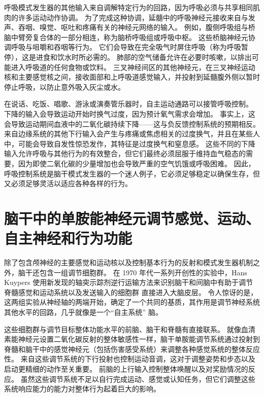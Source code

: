 呼吸模式发生器的其他输入来自调解特定行为的回路，因为呼吸必须与共享相同肌肉的许多运动动作协调。
为了完成这种协调，延髓中的呼吸神经元接收来自与发声、吞咽、嗅觉、呕吐和疼痛有关的神经元网络的输入。
例如，腹侧呼吸组与桥脑中臂旁复合体的一部分相连，称为脑桥呼吸组或呼吸中枢。
这些桥脑神经元协调呼吸与咀嚼和吞咽等行为。
它们会导致在完全吸气时屏住呼吸（称为呼吸暂停），这是进食和饮水时所必需的。
肺部的空气储备允许在必要时咳嗽，以排出可能进入呼吸道的任何食物或饮料。
三叉神经间区的其他神经元，在三叉神经运动核和主要感觉核之间，接收面部和上呼吸道感觉输入，并投射到延髓腹外侧以暂时停止呼吸，以防止意外吸入灰尘或水。


在说话、吃饭、唱歌、游泳或演奏管乐器时，自主运动通路可以接管呼吸控制。
下降的输入会导致运动开始时换气过度，因为预计氧气需求会增加。
事实上，这会导致运动期间血液中的二氧化碳持续下降——这与负反馈控制系统的预期相反。
来自边缘系统的其他下行输入会产生与疼痛或焦虑相关的过度换气，并且在某些人中，可能会导致自发性惊恐发作，其特征是过度换气和窒息感。
这些不同的下降输入允许呼吸与其他行为的有效整合，但它们最终必须屈服于维持血气稳态的需要，因为即使二氧化碳的少量增加也会导致严重的空气饥饿或呼吸困难。
因此，呼吸控制系统是脑干模式发生器的一个迷人例子，它必须足够稳定以确保生存，但又必须足够灵活以适应各种各样的行为。



\section{脑干中的单胺能神经元调节感觉、运动、自主神经和行为功能}

除了包含颅神经的主要感觉和运动核以及控制基本行为的反射和模式发生器机制之外，脑干还包含一组调节细胞群。
在 1970 年代一系列开创性的实验中，Hans Kuypers 使用新发现的轴突示踪剂逆行运输方法来识别脑干和间脑中有助于调节脊髓感觉和运动系统以及发送输入的细胞群 直接进入大脑皮层。
令人惊讶的是，这两组实验从神经轴的两端开始，确定了一个共同的基质，其作用是调节神经系统其他水平的回路，几乎就像是一个“自主系统” 脑。


这些细胞群与调节目标整体功能水平的前脑、脑干和脊髓有直接联系。
就像血清素能神经元设置二氧化碳反射的整体敏感性一样，脑干单胺能调节系统通过投射到脊髓和脑干中的感觉神经元（包括伤害感受系统）来调整各种感觉系统的整体反应性。
来自这些调节系统的下行投射也控制运动音调，这对于调整姿势和步态以及启动更精细的动作至关重要。
前脑的上行输入控制整体唤醒以及对奖励情况的反应。
虽然这些调节系统不足以自行完成运动、感觉或认知任务，但它们调整这些系统响应能力的能力对整体行为起着巨大的影响。



